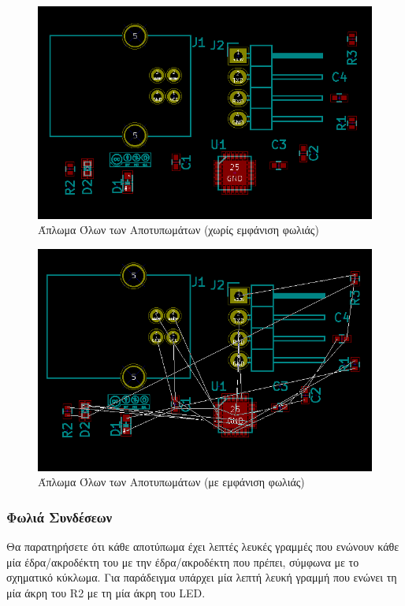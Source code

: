 \documentclass[a4paper]{article}
\begin{document}
\begin{figure}
  \begin{center}
    \includegraphics[width=.9\textwidth]{img/pcb-circ-allspread.png}
    \caption{Άπλωμα Όλων των Αποτυπωμάτων (χωρίς εμφάνιση φωλιάς)}
    \label{fig:pcb-circ-allspread}
  \end{center}
\end{figure}

\begin{figure}
  \begin{center}
    \includegraphics[width=.9\textwidth]{img/pcb-circ-allspreadrat.png}
    \caption{Άπλωμα Όλων των Αποτυπωμάτων (με εμφάνιση φωλιάς)}
    \label{fig:pcb-circ-allspreadrat}
  \end{center}
\end{figure}

\subsubsection{Φωλιά Συνδέσεων}
Θα παρατηρήσετε ότι κάθε αποτύπωμα έχει λεπτές λευκές γραμμές που ενώνουν κάθε μία έδρα/ακροδέκτη του με την έδρα/ακροδέκτη που πρέπει, σύμφωνα με το σχηματικό κύκλωμα. Για παράδειγμα υπάρχει μία λεπτή λευκή γραμμή που ενώνει τη μία άκρη του R2 με τη μία άκρη του LED. 
\end{document}
